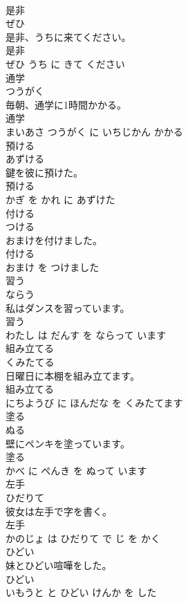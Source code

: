 \documentclass[8pt]{extreport}
\begin{document}
\begin{CJK}{UTF8}{min}
\\	是非	
\\	ぜひ			
\\	是非、うちに来てください。	
\\	是非 
\\	ぜひ うち に きて ください			
\\	通学	
\\	つうがく			
\\	毎朝、通学に1時間かかる。	
\\	通学 
\\	まいあさ つうがく に いちじかん かかる			
\\	預ける	
\\	あずける			
\\	鍵を彼に預けた。	
\\	預ける 
\\	かぎ を かれ に あずけた			
\\	付ける	
\\	つける			
\\	おまけを付けました。	
\\	付ける 
\\	おまけ を つけました			
\\	習う	
\\	ならう			
\\	私はダンスを習っています。	
\\	習う 
\\	わたし は だんす を ならって います			
\\	組み立てる	
\\	くみたてる			
\\	日曜日に本棚を組み立てます。	
\\	組み立てる 
\\	にちようび に ほんだな を くみたてます			
\\	塗る	
\\	ぬる			
\\	壁にペンキを塗っています。	
\\	塗る 
\\	かべ に ぺんき を ぬって います			
\\	左手	
\\	ひだりて			
\\	彼女は左手で字を書く。	
\\	左手 
\\	かのじょ は ひだりて で じ を かく			
\\	ひどい	
\\	妹とひどい喧嘩をした。	
\\	ひどい 
\\	いもうと と ひどい けんか を した			

\end{CJK}
\end{document}
